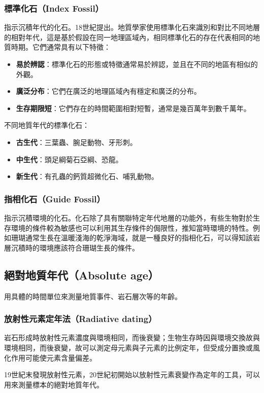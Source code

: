 \documentclass[a4paper,12pt]{report}
\begin{document}
\subsubsection{標準化石（Index Fossil）}
指示沉積年代的化石。18世紀提出。地質學家使用標準化石來識別和對比不同地層的相對年代，這是基於假設在同一地理區域內，相同標準化石的存在代表相同的地質時期。它們通常具有以下特徵：
\begin{itemize}
\item \textbf{易於辨認}：標準化石的形態或特徵通常易於辨認，並且在不同的地區有相似的外觀。 
\item \textbf{廣泛分布}：它們在廣泛的地理區域內有穩定和廣泛的分布。 
\item \textbf{生存期限短}：它們存在的時間範圍相對短暫，通常是幾百萬年到數千萬年。
\end{itemize}
不同地質年代的標準化石：
\begin{itemize}
\item \textbf{古生代}：三葉蟲、腕足動物、牙形刺。 
\item \textbf{中生代}：頭足綱菊石亞綱、恐龍。 
\item \textbf{新生代}：有孔蟲的鈣質超微化石、哺乳動物。
\end{itemize}
\subsubsection{指相化石（Guide Fossil）}
指示沉積環境的化石。化石除了具有關聯特定年代地層的功能外，有些生物對於生存環境的條件較為敏感也可以利用其生存條件的侷限性，推知當時環境的特性。例如珊瑚通常生長在溫暖淺海的乾淨海域，就是一種良好的指相化石，可以得知該岩層沉積時的環境應該符合珊瑚生長的條件。
\subsection{絕對地質年代（Absolute age）}
用具體的時間單位來測量地質事件、岩石層次等的年齡。
\subsubsection{放射性元素定年法（Radiative dating）}
岩石形成時放射性元素濃度與環境相同，而後衰變；生物生存時因與環境交換故與環境相同，而後衰變，故可以測定母元素與子元素的比例定年，但受成分置換或風化作用可能使元素含量偏差。

19世紀末發現放射性元素，20世紀初開始以放射性元素衰變作為定年的工具，可以用來測量標本的絕對地質年代。
\end{document}
